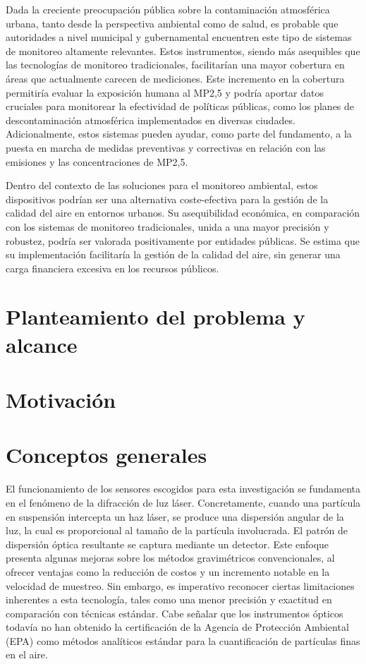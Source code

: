 Dada la creciente preocupación pública sobre la contaminación atmosférica urbana, tanto desde la perspectiva ambiental como de salud, es probable que autoridades a nivel municipal y gubernamental encuentren este tipo de sistemas de monitoreo altamente relevantes. Estos instrumentos, siendo más asequibles que las tecnologías de monitoreo tradicionales, facilitarían una mayor cobertura en áreas que actualmente carecen de mediciones. Este incremento en la cobertura permitiría evaluar la exposición humana al MP2,5 y podría aportar datos cruciales para monitorear la efectividad de políticas públicas, como los planes de descontaminación atmosférica implementados en diversas ciudades. Adicionalmente, estos sistemas pueden ayudar, como parte del fundamento, a la puesta en marcha de medidas preventivas y correctivas en relación con las emisiones y las concentraciones de MP2,5.

Dentro del contexto de las soluciones para el monitoreo ambiental, estos dispositivos podrían ser una alternativa coste-efectiva para la gestión de la calidad del aire en entornos urbanos. Su asequibilidad económica, en comparación con los sistemas de monitoreo tradicionales, unida a una mayor precisión y robustez, podría ser valorada positivamente por entidades públicas. Se estima que su implementación facilitaría la gestión de la calidad del aire, sin generar una carga financiera excesiva en los recursos públicos.

\section{Planteamiento del problema y alcance}

\section{Motivación}

\section{Conceptos generales}

El funcionamiento de los sensores escogidos para esta investigación se fundamenta en el fenómeno de la difracción de luz láser. Concretamente, cuando una partícula en suspensión intercepta un haz láser, se produce una dispersión angular de la luz, la cual es proporcional al tamaño de la partícula involucrada. El patrón de dispersión óptica resultante se captura mediante un detector. Este enfoque presenta algunas mejoras sobre los métodos gravimétricos convencionales, al ofrecer ventajas como la reducción de costos y un incremento notable en la velocidad de muestreo. Sin embargo, es imperativo reconocer ciertas limitaciones inherentes a esta tecnología, tales como una menor precisión y exactitud en comparación con técnicas estándar. Cabe señalar que los instrumentos ópticos todavía no han obtenido la certificación de la Agencia de Protección Ambiental (EPA) como métodos analíticos estándar para la cuantificación de partículas finas en el aire.

